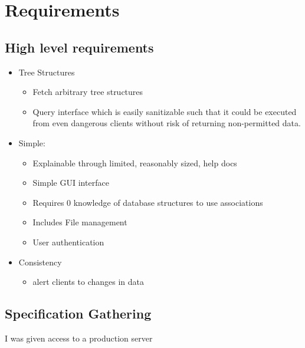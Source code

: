 \documentclass[
  12pt,
]{article}
\providecommand{\tightlist}{%
  \setlength{\itemsep}{0pt}\setlength{\parskip}{0pt}}
\begin{document}
\hypertarget{requirements}{%
\section{Requirements}\label{requirements}}

\hypertarget{high-level-requirements}{%
\subsection{High level requirements}\label{high-level-requirements}}

\begin{itemize}
\tightlist
\item
  Tree Structures

  \begin{itemize}
  \tightlist
  \item
    Fetch arbitrary tree structures
  \item
    Query interface which is easily sanitizable such that it could be
    executed from even dangerous clients without risk of returning
    non-permitted data.
  \end{itemize}
\item
  Simple:

  \begin{itemize}
  \tightlist
  \item
    Explainable through limited, reasonably sized, help docs
  \item
    Simple GUI interface
  \item
    Requires 0 knowledge of database structures to use associations
  \item
    Includes File management
  \item
    User authentication
  \end{itemize}
\item
  Consistency

  \begin{itemize}
  \tightlist
  \item
    alert clients to changes in data
  \end{itemize}
\end{itemize}

\hypertarget{specification-gathering}{%
\subsection{Specification Gathering}\label{specification-gathering}}

I was given access to a production server
\end{document}
